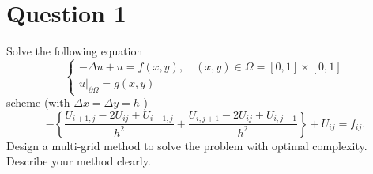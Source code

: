 \section{Question 1}

\begin{question}
    Solve the following equation
    $$\left\{\begin{array}{c}-\Delta u+u=f(x, y), \quad(x, y) \in \Omega=[0,1] \times[0,1] \\ \left.u\right|_{\partial \Omega}=g(x, y)\end{array}\right.$$ scheme (with $\Delta x=\Delta y=h$ )
    $$-\left\{\frac{U_{i+1, j}-2 U_{i j}+U_{i-1, j}}{h^2}+\frac{U_{i, j+1}-2 U_{i j}+U_{i, j-1}}{h^2}\right\}+U_{i j}=f_{i j}.$$
    Design a multi-grid method to solve the problem with optimal complexity. Describe your method clearly.
\end{question}

\begin{answer}
    
\end{answer}